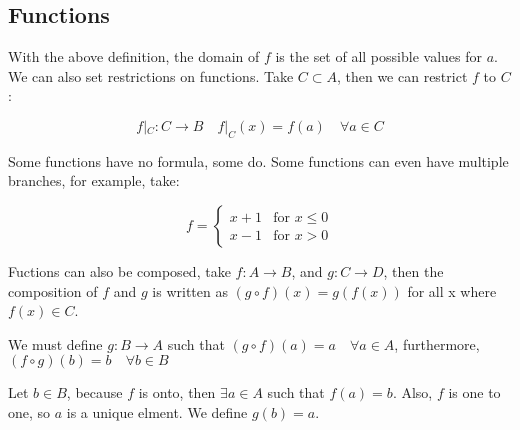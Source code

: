 \subsection{Functions}


With the above definition, the domain of $f$ is the set of all possible values for $a$. 
We can also set restrictions on functions. Take $C \subset A$, then we can restrict $f$ to $C$:

$$
    f|_C: C \rightarrow B \quad f|_C(x) = f(a) \quad \forall a \in C
$$

Some functions have no formula, some do. Some functions can even have multiple branches, for example, take:

\begin{equation*}
    f =
     \begin{cases}
     x+1 & \text{for } x \leq 0 \\
     x-1 & \text{for } x > 0
     \end{cases}
\end{equation*}

Fuctions can also be composed, take $f: A \rightarrow B$, and $g: C \rightarrow D$, then the composition of $f$ and $g$ is 
written as $(g \circ f) (x) = g(f(x))$ for all x where $f(x) \in C$.





We must define $g: B \rightarrow A$ such that $(g \circ f) (a) = a \quad \forall a \in A$, furthermore,  
$(f \circ g) (b) = b \quad \forall b \in B$

Let $b \in B$, because $f$ is onto, then $\exists a \in A$ such that $f(a) = b$. Also, $f$ is one to one, so 
$a$ is a unique elment. We define $g(b) = a$. 

